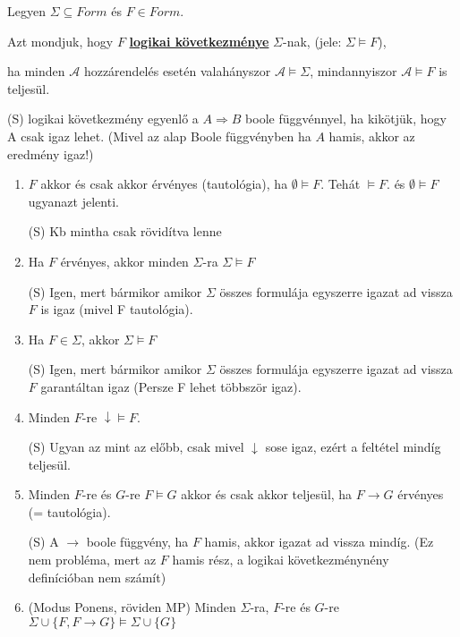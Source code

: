 \documentclass[10pt]{article}
\renewcommand{\\}{\par\noindent}
\begin{document}
\begin{frame}
\begin{tcolorbox}[title={Def.: Logikai következmény}]
Legyen $\Sigma \subseteq Form$ és $F \in Form$.\\
Azt mondjuk, hogy $F$ \underline{\textbf{logikai következménye}} $\Sigma$-nak, (jele: $\Sigma \models F$),\\
ha minden $\mathcal{A}$ hozzárendelés esetén valahányszor $\mathcal{A} \models \Sigma$, mindannyiszor $\mathcal{A} \models F$ is teljesül.\\
{\tiny (S) logikai következmény egyenlő a $A \Rightarrow B$ boole függvénnyel, ha kikötjük, hogy A csak igaz lehet. (Mivel az alap Boole függvényben ha $A$ hamis, akkor az eredmény igaz!)}
\end{tcolorbox}
\medskip
\begin{tcolorbox}[title={Ész}]
\begin{enumerate}
\item $F$ akkor és csak akkor érvényes (tautológia), ha $\emptyset \models F$. Tehát $\models F$. és $\emptyset \models F$ ugyanazt jelenti.\\
{\tiny (S) Kb mintha csak rövidítva lenne}\\
\item Ha $F$ érvényes, akkor minden $\Sigma$-ra $\Sigma \models F$\\
{\tiny (S) Igen, mert bármikor amikor $\Sigma$ összes formulája egyszerre igazat ad vissza $F$ is igaz (mivel F tautológia).}\\
\item Ha $F \in \Sigma$, akkor $\Sigma \models F$\\
{\tiny (S) Igen, mert bármikor amikor $\Sigma$ összes formulája egyszerre igazat ad vissza $F$ garantáltan igaz (Persze F lehet többször igaz).}\\
\item Minden $F$-re $\downarrow \models F$.\\
{\tiny (S) Ugyan az mint az előbb, csak mivel $\downarrow$ sose igaz, ezért a feltétel mindíg teljesül.}\\
\item Minden $F$-re és $G$-re $F \models G$ akkor és csak akkor teljesül, ha $F \rightarrow G$ érvényes (= tautológia).\\
{\tiny (S) A $\rightarrow$ boole függvény, ha $F$ hamis, akkor igazat ad vissza mindíg. (Ez nem probléma, mert az $F$ hamis rész, a logikai következménynény definícióban nem számít)}\\
\item (Modus Ponens, röviden MP) Minden $\Sigma$-ra, $F$-re és $G$-re $\Sigma \cup \{F, F \rightarrow G\} \models \Sigma \cup \{G\}$\\

\end{enumerate}
\end{tcolorbox}
\end{frame}
\end{document}
